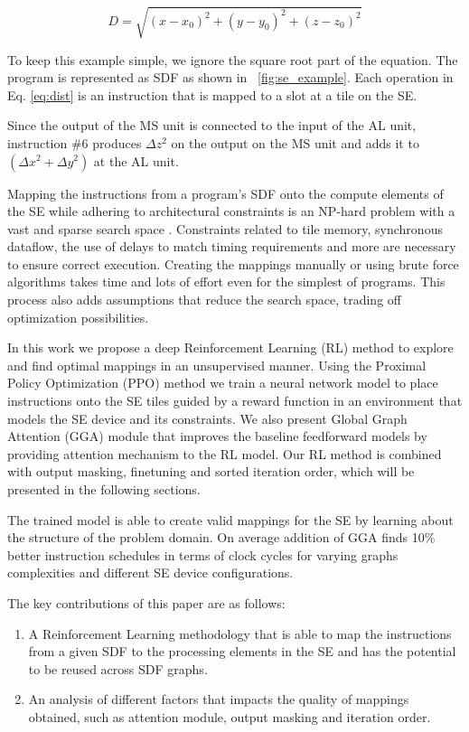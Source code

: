 \begin{equation}
    \label{eq:dist}
    D = \sqrt{(x - x_0)^2 +(y - y_0)^2 + (z - z_0)^2}
\end{equation}

To keep this example simple, we ignore the square root part of the equation.
The program is represented as SDF as shown in \figurename~\ref{fig:se_example}.
Each operation in Eq. \ref{eq:dist} is an instruction that is mapped to a slot at a tile on the SE.

Since the output of the MS unit is connected to the input of the AL unit, instruction \#6 produces $\Delta z^2$ on the output on the MS unit and adds it to $(\Delta x^2 + \Delta y^2)$ at the AL unit.

Mapping the instructions from a program's SDF onto the compute elements of the SE while adhering to architectural constraints is an NP-hard problem with a vast and sparse search space \cite{10.1007/3-540-69346-7_30}. 
Constraints related to tile memory, synchronous dataflow, the use of delays to match timing requirements and more are necessary to ensure correct execution. 
Creating the mappings manually or using brute force algorithms takes time and lots of effort even for the simplest of programs. 
This process also adds assumptions that reduce the search space, trading off optimization possibilities.  

In this work we propose a deep Reinforcement Learning (RL) method to explore and find optimal mappings in an unsupervised manner. 
Using the Proximal Policy Optimization (PPO) method we train a neural network model to place instructions onto the SE tiles guided by a reward function in an environment that models the SE device and its constraints. 
We also present Global Graph Attention (GGA) module that improves the baseline feedforward models by providing attention mechanism to the RL model.
Our RL method is combined with output masking, finetuning and sorted iteration order, which will be presented in the following sections.

The trained model is able to create valid mappings for the SE by learning about the structure of the problem domain.
On average addition of GGA finds 10\% better instruction schedules in terms of clock cycles for varying graphs complexities and different SE device configurations.

The key contributions of this paper are as follows:
\begin{enumerate}
    \item A Reinforcement Learning methodology that is able to map the instructions from a given SDF to the processing elements in the SE and has the potential to be reused across SDF graphs.
    \item An analysis of different factors that impacts the quality of mappings obtained, such as attention module, output masking and iteration order.
\end{enumerate}

